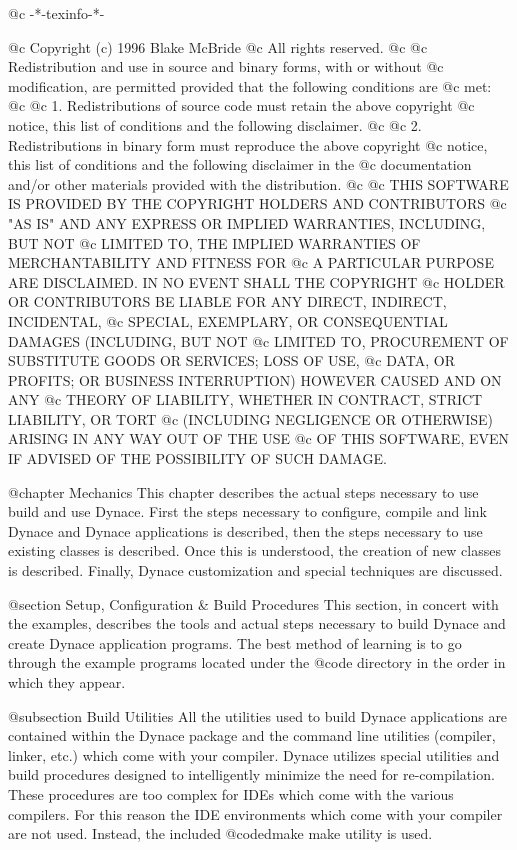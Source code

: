 @c -*-texinfo-*-

@c  Copyright (c) 1996 Blake McBride
@c  All rights reserved.
@c
@c  Redistribution and use in source and binary forms, with or without
@c  modification, are permitted provided that the following conditions are
@c  met:
@c
@c  1. Redistributions of source code must retain the above copyright
@c  notice, this list of conditions and the following disclaimer.
@c
@c  2. Redistributions in binary form must reproduce the above copyright
@c  notice, this list of conditions and the following disclaimer in the
@c  documentation and/or other materials provided with the distribution.
@c
@c  THIS SOFTWARE IS PROVIDED BY THE COPYRIGHT HOLDERS AND CONTRIBUTORS
@c  "AS IS" AND ANY EXPRESS OR IMPLIED WARRANTIES, INCLUDING, BUT NOT
@c  LIMITED TO, THE IMPLIED WARRANTIES OF MERCHANTABILITY AND FITNESS FOR
@c  A PARTICULAR PURPOSE ARE DISCLAIMED. IN NO EVENT SHALL THE COPYRIGHT
@c  HOLDER OR CONTRIBUTORS BE LIABLE FOR ANY DIRECT, INDIRECT, INCIDENTAL,
@c  SPECIAL, EXEMPLARY, OR CONSEQUENTIAL DAMAGES (INCLUDING, BUT NOT
@c  LIMITED TO, PROCUREMENT OF SUBSTITUTE GOODS OR SERVICES; LOSS OF USE,
@c  DATA, OR PROFITS; OR BUSINESS INTERRUPTION) HOWEVER CAUSED AND ON ANY
@c  THEORY OF LIABILITY, WHETHER IN CONTRACT, STRICT LIABILITY, OR TORT
@c  (INCLUDING NEGLIGENCE OR OTHERWISE) ARISING IN ANY WAY OUT OF THE USE
@c  OF THIS SOFTWARE, EVEN IF ADVISED OF THE POSSIBILITY OF SUCH DAMAGE.

@chapter Mechanics
This chapter describes the actual steps necessary to use build and use
Dynace.  First the steps necessary to configure, compile and link Dynace
and Dynace applications is described, then the steps necessary to use
existing classes is described.  Once this is understood, the creation of
new classes is described.  Finally, Dynace customization and special
techniques are discussed.


@section Setup, Configuration & Build Procedures
This section, in concert with the examples, describes the tools and
actual steps necessary to build Dynace and create Dynace application
programs.  The best method of learning is to go through the example
programs located under the @code{\DYNACE\EXAMPLES} directory in the
order in which they appear.

@subsection Build Utilities
All the utilities used to build Dynace applications are contained within
the Dynace package and the command line utilities (compiler, linker,
etc.) which come with your compiler.  Dynace utilizes special utilities
and build procedures designed to intelligently minimize the need for
re-compilation.  These procedures are too complex for IDEs which come
with the various compilers.  For this reason the IDE environments which
come with your compiler are not used.  Instead, the included
@code{dmake} make utility is used.

